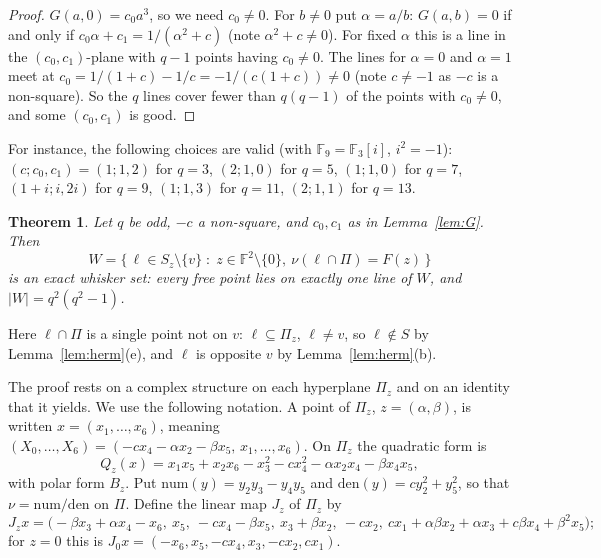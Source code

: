 \documentclass[11pt]{amsart}
\newtheorem{theorem}{Theorem}[section]
\theoremstyle{definition}
\theoremstyle{remark}
\newcommand{\F}{\mathbb{F}}
\begin{document}
\begin{proof}
$G(a,0)=c_0a^3$, so we need $c_0\ne0$. For $b\ne0$ put $\alpha=a/b$: $G(a,b)=0$ if and only if $c_0\alpha+c_1=1/(\alpha^2+c)$ (note $\alpha^2+c\ne0$). For fixed $\alpha$ this is a line in the $(c_0,c_1)$-plane with $q-1$ points having $c_0\ne0$. The lines for $\alpha=0$ and $\alpha=1$ meet at $c_0=1/(1+c)-1/c=-1/(c(1+c))\ne0$ (note $c\ne-1$ as $-c$ is a non-square). So the $q$ lines cover fewer than $q(q-1)$ of the points with $c_0\ne0$, and some $(c_0,c_1)$ is good.
\end{proof}

For instance, the following choices are valid (with $\F_9=\F_3[i]$, $i^2=-1$): $(c;c_0,c_1)=(1;1,2)$ for $q=3$, $(2;1,0)$ for $q=5$, $(1;1,0)$ for $q=7$, $(1+i;i,2i)$ for $q=9$, $(1;1,3)$ for $q=11$, $(2;1,1)$ for $q=13$.

\begin{theorem}\label{thm:exact}
Let $q$ be odd, $-c$ a non-square, and $c_0,c_1$ as in Lemma~\ref{lem:G}. Then
\[
W=\bigl\{\,\ell\in S_z\setminus\{v\}\;:\; z\in\F^2\setminus\{0\},\ \nu(\ell\cap\Pi)=F(z)\,\bigr\}
\]
is an exact whisker set: every free point lies on exactly one line of $W$, and $|W|=q^2(q^2-1)$.
\end{theorem}

Here $\ell\cap\Pi$ is a single point not on $v$: $\ell\subseteq\Pi_z$, $\ell\ne v$, so $\ell\notin S$ by Lemma~\ref{lem:herm}(e), and $\ell$ is opposite $v$ by Lemma~\ref{lem:herm}(b).

The proof rests on a complex structure on each hyperplane $\Pi_z$ and on an identity that it yields. We use the following notation. A point of $\Pi_z$, $z=(\alpha,\beta)$, is written $x=(x_1,\dots,x_6)$, meaning $(X_0,\dots,X_6)=(-cx_4-\alpha x_2-\beta x_5,\,x_1,\dots,x_6)$. On $\Pi_z$ the quadratic form is
\[
Q_z(x)=x_1x_5+x_2x_6-x_3^2-cx_4^2-\alpha x_2x_4-\beta x_4x_5 ,
\]
with polar form $B_z$. Put $\mathrm{num}(y)=y_2y_3-y_4y_5$ and $\mathrm{den}(y)=cy_2^2+y_5^2$, so that $\nu=\mathrm{num}/\mathrm{den}$ on $\Pi$. Define the linear map $J_z$ of $\Pi_z$ by
\[
J_zx=\bigl(-\beta x_3+\alpha x_4-x_6,\ x_5,\ -cx_4-\beta x_5,\ x_3+\beta x_2,\ -cx_2,\ cx_1+\alpha\beta x_2+\alpha x_3+c\beta x_4+\beta^2x_5\bigr);
\]
for $z=0$ this is $J_0x=(-x_6,x_5,-cx_4,x_3,-cx_2,cx_1)$.
\end{document}

